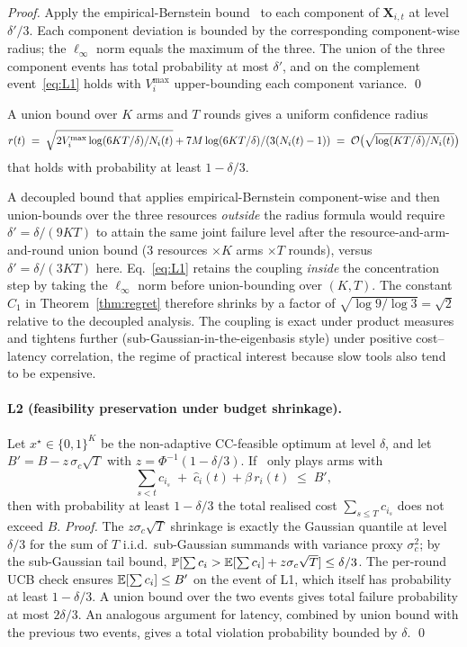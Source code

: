 \emph{Proof.} Apply the empirical-Bernstein
bound~\cite{maurer2009empirical,audibert2009exploration} to each
component of $\mathbf{X}_{i,t}$ at level $\delta'/3$. Each component
deviation is bounded by the corresponding component-wise radius; the
$\ell_\infty$ norm equals the maximum of the three. The union of
the three component events has total probability at most $\delta'$,
and on the complement event~\eqref{eq:L1} holds with $V_i^{\max}$
upper-bounding each component variance. \qed

A union bound over $K$ arms and $T$ rounds gives a uniform confidence
radius
\[
  r(t) \;=\; \sqrt{2 V_i^{\max} \log(6KT/\delta) / N_i(t)}
        + 7M\log(6KT/\delta)/(3(N_i(t)-1))
        \;=\; \mathcal{O}\bigl(\sqrt{\log(KT/\delta)/N_i(t)}\bigr)
\]
that holds with probability at least $1-\delta/3$.

\begin{remark}
\label{rem:l1-coupling}
A decoupled bound that applies empirical-Bernstein component-wise and
then union-bounds over the three resources \emph{outside} the radius
formula would require $\delta' = \delta/(9KT)$ to attain the same
joint failure level after the resource-and-arm-and-round union bound
($3$ resources $\times K$ arms $\times T$ rounds), versus
$\delta' = \delta/(3KT)$ here. Eq.~\eqref{eq:L1} retains the
coupling \emph{inside} the concentration step by taking the
$\ell_\infty$ norm before union-bounding over $(K, T)$. The constant
$C_1$ in Theorem~\ref{thm:regret} therefore shrinks by a factor of
$\sqrt{\log 9 / \log 3} = \sqrt{2}$ relative to the decoupled
analysis. The coupling is exact under product measures and tightens
further (sub-Gaussian-in-the-eigenbasis style) under positive
cost--latency correlation, the regime of practical interest because
slow tools also tend to be expensive.
\end{remark}

\paragraph{L2 (feasibility preservation under budget shrinkage).}
Let $x^\star \in \{0,1\}^K$ be the non-adaptive CC-feasible optimum
at level $\delta$, and let $B' = B - z\,\sigma_c\sqrt{T}$ with
$z = \Phi^{-1}(1-\delta/3)$. If \CBUC~only plays arms with
\[
  \sum_{s < t} c_{i_s}
   \;+\; \hat{c}_{i}(t) + \beta\,r_i(t)
   \;\le\; B',
\]
then with probability at least $1 - \delta/3$ the total realised cost
$\sum_{s \le T} c_{i_s}$ does not exceed $B$. \emph{Proof.} The
$z\sigma_c\sqrt{T}$ shrinkage is exactly the Gaussian quantile at
level $\delta/3$ for the sum of $T$ i.i.d.\ sub-Gaussian summands with
variance proxy $\sigma_c^2$; by the sub-Gaussian tail bound,
$\mathbb{P}[\sum c_i > \mathbb{E}[\sum c_i] + z\sigma_c\sqrt{T}] \le \delta/3$. The
per-round UCB check ensures $\mathbb{E}[\sum c_i] \le B'$ on the event of L1,
which itself has probability at least $1 - \delta/3$. A union bound
over the two events gives total failure probability at most
$2\delta/3$. An analogous argument for latency, combined by union bound
with the previous two events, gives a total violation probability
bounded by $\delta$. \qed

